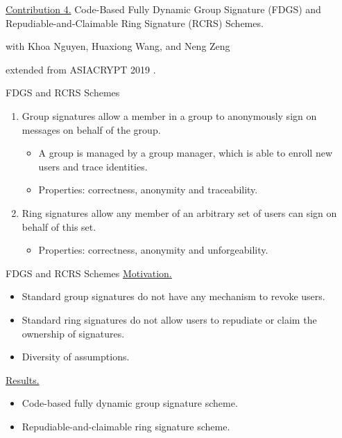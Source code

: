 \begin{frame}{}
	\underline{Contribution 4.} Code-Based Fully Dynamic Group Signature (FDGS) and Repudiable-and-Claimable Ring Signature (RCRS) Schemes.
	
	{\small with Khoa Nguyen, Huaxiong Wang, and Neng Zeng}
	
	extended from ASIACRYPT 2019 \cite{NguyenTWZ19}.
\end{frame}

\begin{frame}{FDGS and RCRS Schemes}
	\begin{enumerate}
		\item Group signatures allow a member in a group to anonymously sign on messages on behalf of the group.
		\begin{itemize}
			\item A group is managed by a group manager, which is able to enroll new users and trace identities.
			\item Properties: correctness, anonymity and traceability.
		\end{itemize}
		\item Ring signatures allow any member of an arbitrary set of users can sign on behalf of this set.
		\begin{itemize}
			\item Properties: correctness, anonymity and unforgeability.
		\end{itemize}
	\end{enumerate}
\end{frame}

\begin{frame}{FDGS and RCRS Schemes}
	\underline{Motivation.}
	\begin{itemize}
		\item Standard group signatures do not have any mechanism to revoke users.
		\item Standard ring signatures do not allow users to repudiate or claim the ownership of signatures.
		\item Diversity of assumptions.
	\end{itemize}
	\underline{Results.}
	\begin{itemize}
		\item Code-based fully dynamic group signature scheme.
		\item Repudiable-and-claimable ring signature scheme.
	\end{itemize}
\end{frame}

